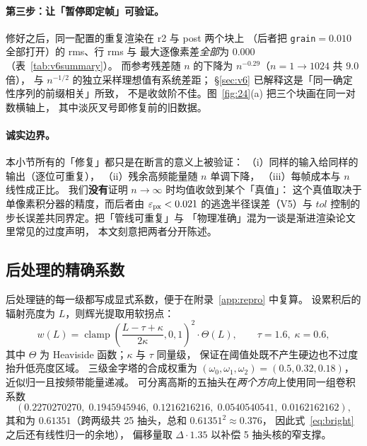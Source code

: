\paragraph{第三步：让「暂停即定帧」可验证。}
修好之后，同一配置的重复渲染在 r2 与 post 两个块上
（后者把 \texttt{grain}$=0.010$ 全部打开）的 rms、行 rms 与
最大逐像素差\emph{全部}为 $0.000$（表~\ref{tab:v6summary}）。
而参考残差随 $n$ 的下降为 $n^{-0.29}$（$n=1\to1024$ 共 $9.0$ 倍），
与 $n^{-1/2}$ 的独立采样理想值有系统差距；
§\ref{sec:v6} 已解释这是「同一确定性序列的前缀相关」所致，
不是收敛阶不佳。图~\ref{fig:24}(a) 把三个块画在同一对数横轴上，
其中淡灰叉号即修复前的旧数据。

\paragraph{诚实边界。}
本小节所有的「修复」都只是在断言的意义上被验证：
（i）同样的输入给同样的输出（逐位可重复），
（ii）残余高频能量随 $n$ 单调下降，
（iii）每帧成本与 $n$ 线性成正比。
我们\textbf{没有}证明 $n\to\infty$ 时均值收敛到某个「真值」：
这个真值取决于单像素积分器的精度，而后者由
$\varepsilon_{\rm px}<0.021$ 的逃逸半径误差（V5）与
$tol$ 控制的步长误差共同界定。把「管线可重复」与
「物理准确」混为一谈是渐进渲染论文里常见的过度声明，
本文刻意把两者分开陈述。

\subsection{后处理的精确系数}

后处理链的每一级都写成显式系数，便于在附录~\ref{app:repro} 中复算。
设累积后的辐射亮度为 $L$，则辉光提取用软拐点：
\begin{equation}
w(L)=\operatorname{clamp}\!\left(\frac{L-\tau+\kappa}{2\kappa},0,1\right)^{2}
\cdot\Theta(L),\qquad \tau=1.6,\;\kappa=0.6,
\label{eq:bright}
\end{equation}
其中 $\Theta$ 为 Heaviside 函数；$\kappa$ 与 $\tau$ 同量级，
保证在阈值处既不产生硬边也不过度抬升低亮度区域。
三级金字塔的合成权重为
$(\omega_0,\omega_1,\omega_2)=(0.5,0.32,0.18)$，
近似归一且按频带能量递减。
可分离高斯的五抽头在\emph{两个方向}上使用同一组卷积系数
\begin{equation}
(0.2270270270,\;0.1945945946,\;0.1216216216,\;0.0540540541,\;0.0162162162),
\label{eq:gauss}
\end{equation}
其和为 $0.61351$（跨两级共 25 抽头，总和 $0.61351^2\approx0.376$，
因此式~\eqref{eq:bright} 之后还有线性归一的余地），
偏移量取 $\Delta\cdot1.35$ 以补偿 5 抽头核的窄支撑。


